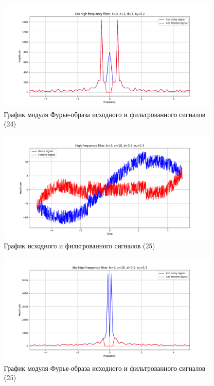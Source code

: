 \documentclass[a4paper, 12pt]{article}
\begin{document}
    \begin{figure}[!htb]
        \centering
        \includegraphics[scale=0.48]{24_abs_u_U_nolow.png}
        \captionsetup{skip=0pt}
        \caption{График модуля Фурье-образа исходного и фильтрованного сигналов (24)}
        \label{fig:fig_f}
    \end{figure}
    \begin{figure}[!htb]
        \centering
        \includegraphics[scale=0.48]{25_u_flt_u_nolow.png}
        \captionsetup{skip=0pt}
        \caption{График исходного и фильтрованного сигналов (25)}
        \label{fig:fig_g}
    \end{figure}
    \begin{figure}[!htb]
        \centering
        \includegraphics[scale=0.48]{25_abs_u_U_nolow.png}
        \captionsetup{skip=0pt}
        \caption{График модуля Фурье-образа исходного и фильтрованного сигналов (25)}
        \label{fig:fig_h}
    \end{figure}
\end{document}
